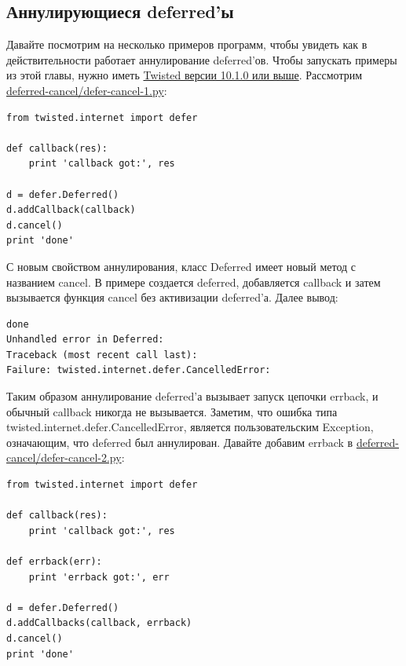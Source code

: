 \subsection{Аннулирующиеся deferred'ы}

Давайте посмотрим на несколько примеров программ, чтобы увидеть 
как в действительности работает аннулирование deferred'ов. Чтобы запускать 
примеры из этой главы, нужно иметь 
\href{http://twistedmatrix.com/trac/wiki/Downloads}{Twisted версии 10.1.0 или выше}.  
Рассмотрим \href{http://github.com/jdavisp3/twisted-intro/blob/master/deferred-cancel/defer-cancel-1.py#L1}{deferred-cancel/defer-cancel-1.py}:

\begin{scriptsize}\begin{verbatim}
from twisted.internet import defer

def callback(res):
    print 'callback got:', res

d = defer.Deferred()
d.addCallback(callback)
d.cancel()
print 'done'
\end{verbatim}\end{scriptsize}


С новым свойством аннулирования, класс Deferred имеет новый 
метод с названием cancel. В примере создается deferred, 
добавляется callback и затем вызывается функция cancel без 
активизации deferred'а.  Далее вывод:

\begin{scriptsize}\begin{verbatim}
done
Unhandled error in Deferred:
Traceback (most recent call last):
Failure: twisted.internet.defer.CancelledError:
\end{verbatim}\end{scriptsize}


Таким образом аннулирование deferred'а вызывает запуск 
цепочки errback, и обычный callback никогда не вызывается. 
Заметим, что ошибка типа twisted.internet.defer.CancelledError, 
является пользовательским Exception, означающим, что deferred 
был аннулирован. Давайте добавим errback в 
\href{http://github.com/jdavisp3/twisted-intro/blob/master/deferred-cancel/defer-cancel-2.py#L1}{deferred-cancel/defer-cancel-2.py}:

\begin{scriptsize}\begin{verbatim}
from twisted.internet import defer

def callback(res):
    print 'callback got:', res

def errback(err):
    print 'errback got:', err

d = defer.Deferred()
d.addCallbacks(callback, errback)
d.cancel()
print 'done'
\end{verbatim}\end{scriptsize}


